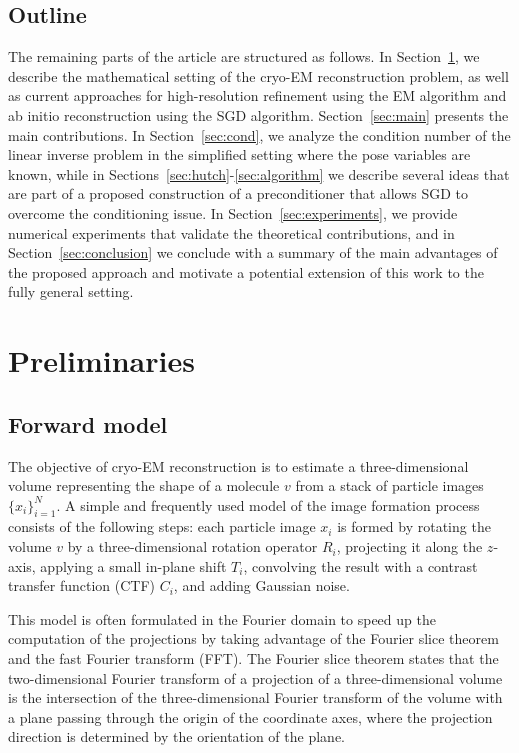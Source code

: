 \documentclass{article}
\begin{document}
\subsection{Outline}

The remaining parts of the article are structured as follows. 
In Section~\ref{sec:preliminaries}, we describe the mathematical setting of the 
cryo-EM reconstruction problem, as well as current approaches for high-resolution 
refinement using the EM algorithm and ab initio reconstruction using the
SGD algorithm. Section~\ref{sec:main} presents the main contributions. 
In Section~\ref{sec:cond}, we analyze the condition number of the linear inverse
problem in the simplified setting where the pose variables are known, while
in Sections~\ref{sec:hutch}-\ref{sec:algorithm} we describe several ideas 
that are part of a proposed construction of a preconditioner that allows SGD
to overcome the conditioning issue. In Section~\ref{sec:experiments}, we provide 
numerical experiments that validate the theoretical contributions, and in 
Section~\ref{sec:conclusion} we conclude with a summary of the main advantages 
of the proposed approach and motivate a potential extension of this work to the
fully general setting.


\section{Preliminaries}
\label{sec:preliminaries}

\subsection{Forward model}

The objective of cryo-EM reconstruction is to estimate a three-dimensional volume 
representing the shape of a molecule $v$ from a stack of particle images 
$\{x_i\}_{i=1}^N$. 
A simple and frequently used model of the image formation process consists of the
following steps: each particle image $x_i$ is formed by rotating the volume $v$ 
by a three-dimensional rotation operator $R_i$, projecting it along the $z$-axis, 
applying a small in-plane shift $T_i$, convolving the result with a contrast
transfer function (CTF) $C_i$, and adding Gaussian noise.

This model is often formulated in the Fourier domain to speed up the computation
of the projections by taking advantage of the Fourier slice theorem and the fast 
Fourier transform (FFT). The Fourier slice theorem states that the two-dimensional 
Fourier transform of a projection of a three-dimensional volume is the intersection 
of the three-dimensional Fourier transform of the volume with a plane passing through 
the origin of the coordinate axes, where the projection direction is determined 
by the orientation of the plane.
\end{document}
